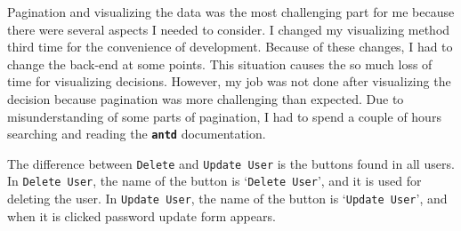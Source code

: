 Pagination and visualizing the data was the most challenging part for me because there were several aspects I needed to consider. I changed my visualizing method third time for the convenience of development. Because of these changes, I had to change the back-end at some points. This situation causes the so much loss of time for visualizing decisions. However, my job was not done after visualizing the decision because pagination was more challenging than expected. Due to misunderstanding of  some parts of pagination, I had to spend a couple of hours searching and reading the \textbf{\texttt{antd}} documentation.

The difference between \texttt{Delete} and \texttt{Update User} is the buttons found in all users. In \texttt{Delete User}, the name of the button is `\texttt{Delete User}', and it is used for deleting the user. In \texttt{Update User}, the name of the button is `\texttt{Update User}', and when it is clicked password update form appears.

